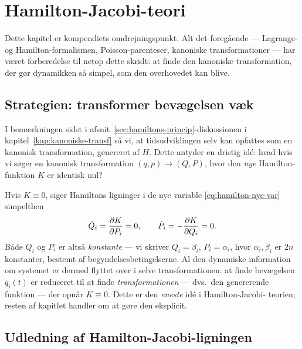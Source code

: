 
\chapter{Hamilton-Jacobi-teori}
\label{kap:hj}

Dette kapitel er kompendiets omdrejningspunkt. Alt det foregående —
Lagrange- og Hamilton-formalismen, Poisson-parenteser, kanoniske
transformationer — har været forberedelse til netop dette skridt:
at finde den kanoniske transformation, der gør dynamikken så simpel,
som den overhovedet kan blive.

\section{Strategien: transformer bevægelsen væk}

I bemærkningen sidst i afsnit~\ref{sec:hamiltons-princip}-diskussionen
i kapitel~\ref{kap:kanoniske-transf} så vi, at tidsudviklingen selv kan
opfattes som en kanonisk transformation, genereret af $H$. Dette
antyder en dristig idé: hvad hvis vi søger en kanonisk transformation
$(q,p)\to(Q,P)$, hvor den \emph{nye} Hamilton-funktion $K$ er identisk
nul?

Hvis $K\equiv 0$, siger Hamiltons ligninger i de nye variable
\eqref{eq:hamilton-nye-var} simpelthen
\begin{equation}
  \dot Q_i = \pdv{K}{P_i} = 0, \qquad \dot P_i = -\pdv{K}{Q_i} = 0.
\end{equation}
Både $Q_i$ og $P_i$ er altså \emph{konstante} — vi skriver
$Q_i=\beta_i$, $P_i=\alpha_i$, hvor $\alpha_i,\beta_i$ er $2n$
konstanter, bestemt af begyndelsesbetingelserne. Al den dynamiske
information om systemet er dermed flyttet over i selve
transformationen: at finde bevægelsen $q_i(t)$ er reduceret til at
finde \emph{transformationen} — dvs.\ den genererende funktion — der
opnår $K\equiv 0$. Dette er den \emph{eneste} idé i Hamilton-Jacobi-
teorien; resten af kapitlet handler om at gøre den eksplicit.

\section{Udledning af Hamilton-Jacobi-ligningen}

